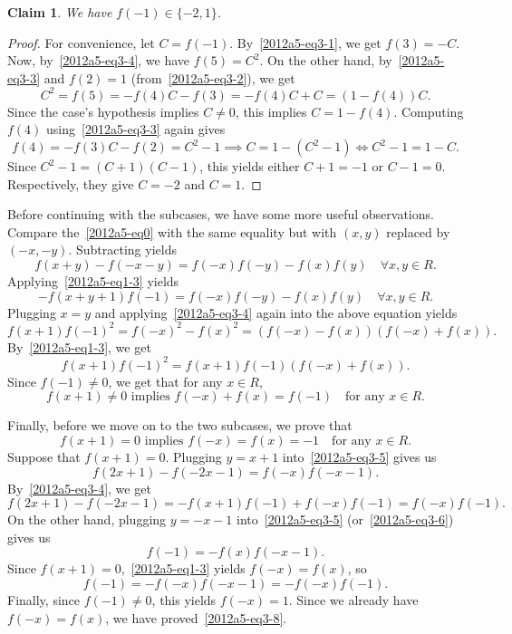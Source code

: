 \documentclass{article}
\newtheorem*{claim}{Claim}
\begin{document}
\begin{claim}
We have $f(-1) \in \{-2, 1\}$.
\end{claim}
\begin{proof}
For convenience, let $C = f(-1)$.
By~\eqref{2012a5-eq3-1}, we get $f(3) = -C$.
Now, by~\eqref{2012a5-eq3-4}, we have $f(5) = C^2$.
On the other hand, by~\eqref{2012a5-eq3-3} and $f(2) = 1$ (from~\eqref{2012a5-eq3-2}), we get
\[ C^2 = f(5) = -f(4) C - f(3) = -f(4) C + C = (1 - f(4)) C. \]
Since the case's hypothesis implies $C \neq 0$, this implies $C = 1 - f(4)$.
Computing $f(4)$ using~\eqref{2012a5-eq3-3} again gives
\[ f(4) = -f(3) C - f(2) = C^2 - 1 \implies C = 1 - (C^2 - 1) \iff C^2 - 1 = 1 - C. \]
Since $C^2 - 1 = (C + 1)(C - 1)$, this yields either $C + 1 = -1$ or $C - 1 = 0$.
Respectively, they give $C = -2$ and $C = 1$.
\end{proof}

Before continuing with the subcases, we have some more useful observations.
Compare the~\eqref{2012a5-eq0} with the same equality but with $(x, y)$ replaced by $(-x, -y)$.
Subtracting yields
\[ f(x + y) - f(-x - y) = f(-x) f(-y) - f(x) f(y) \quad \forall x, y \in R. \tag{3.5}\label{2012a5-eq3-5} \]
Applying~\eqref{2012a5-eq1-3} yields
\[ -f(x + y + 1) f(-1) = f(-x) f(-y) - f(x) f(y) \quad \forall x, y \in R. \tag{3.6}\label{2012a5-eq3-6} \]
Plugging $x = y$ and applying~\eqref{2012a5-eq3-4} again into the above equation yields
\[ f(x + 1) f(-1)^2 = f(-x)^2 - f(x)^2 = (f(-x) - f(x)) (f(-x) + f(x)). \]
By~\eqref{2012a5-eq1-3}, we get
\[ f(x + 1) f(-1)^2 = f(x + 1) f(-1) (f(-x) + f(x)). \]
Since $f(-1) \neq 0$, we get that for any $x \in R$,
\[ f(x + 1) \neq 0 \text{ implies } f(-x) + f(x) = f(-1) \quad \text{for any } x \in R. \tag{3.7}\label{2012a5-eq3-7} \]

Finally, before we move on to the two subcases, we prove that
\[ f(x + 1) = 0 \text{ implies } f(-x) = f(x) = -1 \quad \text{for any } x \in R. \tag{3.8}\label{2012a5-eq3-8} \]
Suppose that $f(x + 1) = 0$.
Plugging $y = x + 1$ into~\eqref{2012a5-eq3-5} gives us
\[ f(2x + 1) - f(-2x - 1) = f(-x) f(-x - 1). \]
By~\eqref{2012a5-eq3-4}, we get
\[ f(2x + 1) - f(-2x - 1) = -f(x + 1) f(-1) + f(-x) f(-1) = f(-x) f(-1). \]
On the other hand, plugging $y = -x - 1$ into~\eqref{2012a5-eq3-5} (or~\eqref{2012a5-eq3-6}) gives us
\[ f(-1) = -f(x) f(-x - 1). \]
Since $f(x + 1) = 0$,~\eqref{2012a5-eq1-3} yields $f(-x) = f(x)$, so
\[ f(-1) = -f(-x) f(-x - 1) = -f(-x) f(-1). \]
Finally, since $f(-1) \neq 0$, this yields $f(-x) = 1$.
Since we already have $f(-x) = f(x)$, we have proved~\eqref{2012a5-eq3-8}.
\end{document}
